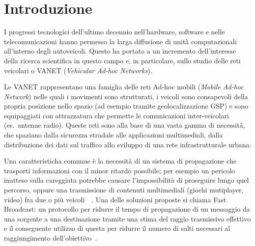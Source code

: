 
\chapter{Introduzione}\label{chap:introduction}
I progressi tecnologici dell'ultimo decennio nell'hardware, software e nelle telecomunicazioni hanno permesso
la larga diffusione di unità computazionali all'interno degli autoveicoli.%
Questo ha portato a un incremento dell'interesse della ricerca scientifica in questo campo e, in particolare,
sullo studio delle reti veicolari o VANET (\textit{Vehicular Ad-hoc Networks}).

Le VANET rappresentano una famiglia delle reti Ad-hoc mobili (\textit{Mobile Ad-hoc Network})
nelle quali i movimenti sono strutturati, i veicoli sono consapevoli della propria posizione nello spazio (ad esempio tramite geolocalizzazione GSP)
e sono equipaggiati con attrazzatura che permette le comunicazioni inter-veicolari (es.~antenne radio).
Queste reti sono alla base di una vasta gamma di necessità, che spaziano dalla sicurezza stradale alle applicazioni multimediali,
dalla distribuzione dei dati sul traffico allo sviluppo di una rete infrastrutturale urbana.

Una caratteristicha comunue è la necessità di un sistema di propagazione che trasporti informazioni
con il minor ritardo possibile; per esempio un pericolo inatteso sulla careggiata potrebbe causare l'impossibilità di proseguire
lungo quel percorso, oppure una trasmissione di contenuti multimediali (giochi mutiplayer, video) fra due o più veicoli~\cite{1580935}~\cite{PantelW02}.
Una delle soluzioni proposte si chiama Fast Broadcast: un protocollo per ridurre il tempo di propagazione
di un messaggio da una sorgente a una destinazione tramite una stima del raggio trasmissivo effettivo e
il conseguente utilizzo di questa per ridurre il numero di salti necessari al raggiungimento dell'obiettivo~\cite{Palazzi07howdo}.

